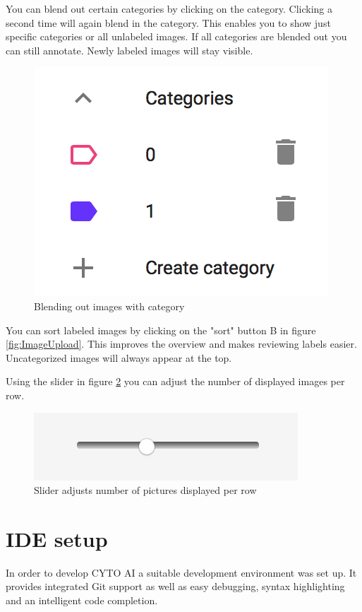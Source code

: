 You can blend out certain categories by
clicking on the category.
Clicking a second time will again blend
in the category.
This enables you to show just specific
categories or all unlabeled images.
If all categories are blended out you can still
annotate. Newly labeled images will stay visible.
 
\begin{figure}[H]
 	\centering
 	\includegraphics[scale=0.8]{bilder/cyto/BlendedOut.png}
 	\caption{Blending out images with category}
 	\label{fig:BlendingOut}
\end{figure}
  
You can sort labeled images by clicking on the "sort" button B in figure \ref{fig:ImageUpload}.
This improves the
overview and makes reviewing labels easier. Uncategorized
images will always appear at the top.
 
Using the slider in figure \ref{fig:Slider} you can adjust
the number of displayed images per row.

\begin{figure}[H]
	\centering
	\includegraphics[scale=0.8]{bilder/cyto/Slider.png}
	\caption{Slider adjusts number of pictures displayed per row}
	\label{fig:Slider}
\end{figure}

\section{IDE setup}
In order to develop CYTO AI a suitable development 
environment was set up.
It provides integrated Git support as well as easy debugging, syntax highlighting and an intelligent code completion.

